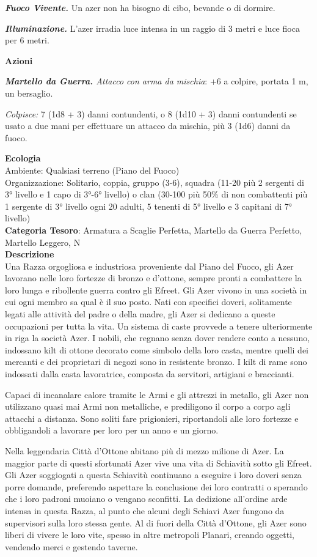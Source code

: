 \begin{multicols}{2}
{\emph{\textbf{Fuoco Vivente.}} Un azer non ha bisogno di cibo, bevande o di dormire.

\emph{\textbf{Illuminazione.}} L'azer irradia luce intensa in un raggio di 3 metri e luce fioca per 6 metri.

\textbf{Azioni}

\emph{\textbf{Martello da Guerra.} Attacco con arma da mischia}: +6 a colpire, portata 1 m, un bersaglio.

\emph{Colpisce:} 7 (1d8 + 3) danni contundenti, o 8 (1d10 + 3) danni contundenti se usato a due mani per effettuare un attacco da mischia, più 3 (1d6) danni da fuoco.

\textbf{Ecologia}\\
Ambiente: Qualsiasi terreno (Piano del Fuoco)\\
Organizzazione: Solitario, coppia, gruppo (3-6), squadra (11-20 più 2 sergenti di 3° livello e 1 capo di 3°-6° livello) o clan (30-100 più 50\% di non combattenti più 1 sergente di 3° livello ogni 20 adulti, 5 tenenti di 5° livello e 3 capitani di 7° livello)\\
\textbf{Categoria Tesoro}: Armatura a Scaglie Perfetta, Martello da Guerra Perfetto, Martello Leggero, N\\
\textbf{Descrizione}\\
Una Razza orgogliosa e industriosa proveniente dal Piano del Fuoco, gli Azer lavorano nelle loro fortezze di bronzo e d'ottone, sempre pronti a combattere la loro lunga e ribollente guerra contro gli Efreet. Gli Azer vivono in una società in cui ogni membro sa qual è il suo posto. Nati con specifici doveri, solitamente legati alle attività del padre o della madre, gli Azer si dedicano a queste occupazioni per tutta la vita. Un sistema di caste provvede a tenere ulteriormente in riga la società Azer. I nobili, che regnano senza dover rendere conto a nessuno, indossano kilt di ottone decorato come simbolo della loro casta, mentre quelli dei mercanti e dei proprietari di negozi sono in resistente bronzo. I kilt di rame sono indossati dalla casta lavoratrice, composta da servitori, artigiani e braccianti.

Capaci di incanalare calore tramite le Armi e gli attrezzi in metallo, gli Azer non utilizzano quasi mai Armi non metalliche, e prediligono il corpo a corpo agli attacchi a distanza. Sono soliti fare prigionieri, riportandoli alle loro fortezze e obbligandoli a lavorare per loro per un anno e un giorno.

Nella leggendaria Città d'Ottone abitano più di mezzo milione di Azer. La maggior parte di questi sfortunati Azer vive una vita di Schiavitù sotto gli Efreet. Gli Azer soggiogati a questa Schiavitù continuano a eseguire i loro doveri senza porre domande, preferendo aspettare la conclusione dei loro contratti o sperando che i loro padroni muoiano o vengano sconfitti. La dedizione all'ordine arde intensa in questa Razza, al punto che alcuni degli Schiavi Azer fungono da supervisori sulla loro stessa gente. Al di fuori della Città d'Ottone, gli Azer sono liberi di vivere le loro vite, spesso in altre metropoli Planari, creando oggetti, vendendo merci e gestendo taverne.

}
\end{multicols}
